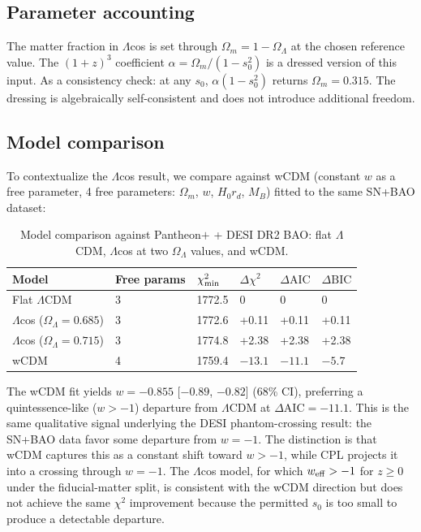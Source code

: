 \documentclass[
  aps,
  prd,
  onecolumn,         %
  nofootinbib,
  longbibliography
]{revtex4-2}
\begin{document}
\subsection{Parameter accounting}\label{sec:param-accounting}

The matter fraction in $\Lambda$cos is set through $\Omega_m = 1 - \Omega_\Lambda$ at the chosen
reference value. The $(1+z)^3$ coefficient $\alpha = \Omega_m/(1-s_0^2)$ is a dressed
version of this input. As a consistency check: at any $s_0$, $\alpha(1 - s_0^2)$
returns $\Omega_m = 0.315$. The dressing is algebraically self-consistent and
does not introduce additional freedom.

\subsection{Model comparison}\label{sec:model-comparison}

To contextualize the $\Lambda$cos result, we compare against wCDM (constant $w$ as
a free parameter, 4 free parameters: $\Omega_m$, $w$, $H_0 r_d$, $M_B$) fitted to
the same SN+BAO dataset:

\begin{table}[!ht]
\centering\footnotesize
\caption{Model comparison against Pantheon$+$ + DESI DR2 BAO: flat $\Lambda$CDM, $\Lambda$cos at two $\Omega_\Lambda$ values, and wCDM.}\label{tab:model-comparison}
\begin{tabular}{@{}llllll@{}}
\toprule
Model & Free params & $\chi^2_{\rm min}$ & $\Delta\chi^2$ & $\Delta\mathrm{AIC}$ & $\Delta\mathrm{BIC}$ \\
\midrule

Flat $\Lambda$CDM & 3 & 1772.5 & 0 & 0 & 0 \\
$\Lambda$cos ($\Omega_\Lambda = 0.685$) & 3 & 1772.6 & +0.11 & +0.11 & +0.11 \\
$\Lambda$cos ($\Omega_\Lambda = 0.715$) & 3 & 1774.8 & +2.38 & +2.38 & +2.38 \\
wCDM & 4 & 1759.4 & $-13.1$ & $-11.1$ & $-5.7$ \\
\bottomrule
\end{tabular}
\end{table}

The wCDM fit yields $w = -0.855$ [$-0.89$, $-0.82$] (68\% CI), preferring
a quintessence-like ($w > -1$) departure from $\Lambda$CDM at $\Delta\mathrm{AIC} =
-11.1$. This is the same qualitative signal underlying the DESI
phantom-crossing result: the SN+BAO data favor some departure from
$w = -1$. The distinction is that wCDM captures this as a constant shift
toward $w > -1$, while CPL projects it into a crossing
through $w = -1$. The $\Lambda$cos model, for which $w_{\rm eff} > -1$ for $z \geq 0$ under
the fiducial-matter split, is consistent with the wCDM direction but does not
achieve the same $\chi^2$ improvement because the permitted $s_0$ is too small
to produce a detectable departure.
\end{document}
